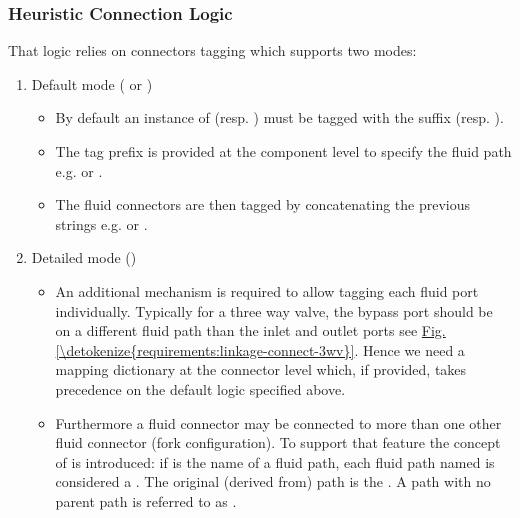 \documentclass[letterpaper,10pt, openany,english]{sphinxmanual}
\begin{document}
\subsubsection{Heuristic Connection Logic}
\label{\detokenize{requirements:heuristic-connection-logic}}\label{\detokenize{requirements:sec-heuristic}}
That logic relies on connectors tagging which supports two modes:
\begin{enumerate}
%
\item {} 
Default mode ( or )
\begin{itemize}
\item {} 
By default an instance of  (resp. ) must be tagged with the suffix  (resp. ).

\item {} 
The tag prefix is provided at the component level to specify the fluid path e.g.  or .

\item {} 
The fluid connectors are then tagged by concatenating the previous strings e.g.  or .

\end{itemize}

\item {} 
Detailed mode ()
\begin{itemize}
\item {} 
An additional mechanism is required to allow tagging each fluid port individually. Typically for a three way valve, the bypass port should be on a different fluid path than the inlet and outlet ports see \hyperref[\detokenize{requirements:linkage-connect-3wv}]{Fig.\@ \ref{\detokenize{requirements:linkage-connect-3wv}}}. Hence we need a mapping dictionary at the connector level which, if provided, takes precedence on the default logic specified above.

\item {} 
Furthermore a fluid connector may be connected to more than one other fluid connector (fork configuration). To support that feature the concept of  is introduced: if  is the name of a fluid path, each fluid path named  is considered a . The original (derived from) path is the . A path with no parent path is referred to as .


\end{itemize}
\end{enumerate}
\end{document}
